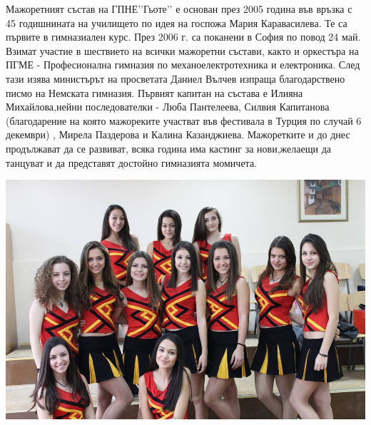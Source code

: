 \begin{multicols}{2}
Мажоретният състав на ГПНЕ’’Гьоте’’ е основан през 2005 година във връзка с 45 
годишнината на училището по идея на госпожа Мария Каравасилева. Те са първите в 
гимназиален курс. През 2006 г. са поканени в София по повод 24 май. Взимат 
участие в шествието на всички мажоретни състави, както и оркестъра на ПГМЕ - 
Професионална гимназия по механоелектротехника и електроника. След тази изява 
министърът на просветата Даниел Вълчев изпраща благодарствено писмо на Немската 
гимназия. Първият капитан на състава е Илияна Михайлова,нейни последователки - 
Люба Пантелеева, Силвия Капитанова (благодарение на която мажореките участват 
във фестивала в Турция по случай 6 декември) , Мирела Паздерова и Калина 
Казанджиева. Мажоретките и до днес продължават да се развиват, всяка година има 
кастинг за нови,желаещи да танцуват и да представят достойно гимназията 
момичета.

\end{multicols}

\begin{center}
\includegraphics[width=6.1in]{./Magoretki/M.jpg}
\end{center}

\closearticle
